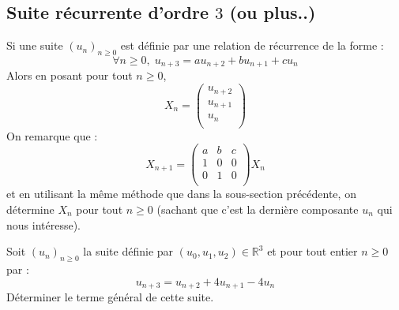 \documentclass[french,11pt,twoside]{VcCours}
\begin{document}
\subsection{Suite récurrente d'ordre \texorpdfstring{$3$}{3} (ou plus..)}
Si une suite $(u_n)_{n \geq 0}$ est définie par une relation de récurrence de la forme :
$$ \forall n \geq 0, \; u_{n+3} = a u_{n+2}+b  u_{n+1}+cu_{n}$$
Alors en posant pour tout $n \geq 0$,
$$ X_n = \begin{pmatrix}
u_{n+2} \\
u_{n+1} \\
u_n \\
\end{pmatrix}$$
On remarque que :
$$ X_{n+1} = \begin{pmatrix}
a & b & c \\
1 & 0 & 0 \\
0 & 1 & 0 \\
\end{pmatrix} X_{n}$$
et en utilisant la même méthode que dans la sous-section précédente, on détermine $X_n$ pour tout $n \geq 0$ (sachant que c'est la dernière composante $u_n$ qui nous intéresse).


\begin{ApplicationDirecte}{} Soit $(u_n)_{n \geq 0}$ la suite définie par $(u_0,u_1,u_2) \in \mathbb{R}^3$ et pour tout entier $n \geq 0$ par :
$$ u_{n+3} = u_{n+2}+ 4u_{n+1} - 4 u_n$$
Déterminer le terme général de cette suite.
\end{ApplicationDirecte}

%
\end{document}
